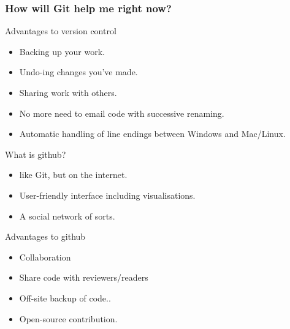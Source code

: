 \documentclass{beamer}
\begin{document}
\begin{frame}
  \frametitle{How will Git help me right now?}

  \begin{block}{Advantages to version control}
    \begin{itemize}  
      \item Backing up your work.
      \item Undo-ing changes you've made.
      \item Sharing work with others.
      \item No more need to email code with successive renaming.
      \item Automatic handling of line endings between Windows and Mac/Linux.
    \end{itemize}
  \end{block}
\end{frame}

\begin{frame}

  \begin{block}{What is github?}
    \begin{itemize}  
      \item like Git, but on the internet.
      \item User-friendly interface including visualisations.
      \item A social network of sorts.
    \end{itemize}
  \end{block}

  \begin{block}{Advantages to github}
    \begin{itemize}  
      \item Collaboration
      \item Share code with reviewers/readers
      \item Off-site backup of code..
      \item Open-source contribution.
    \end{itemize}
  \end{block}

\end{frame}
\end{document}

